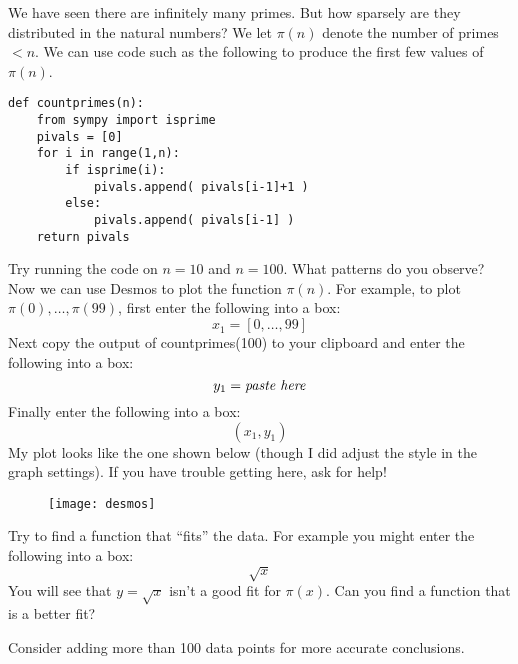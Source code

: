 \documentclass[12pt]{exam}
\begin{document}
\begin{questions}
  \question We have seen there are infinitely many primes. But how sparsely are they distributed in the natural numbers? We let $\pi(n)$ denote the number of primes $<n$. We can use code such as the following to produce the first few values of $\pi(n)$.
  
  \begin{lstlisting}
def countprimes(n):
    from sympy import isprime
    pivals = [0]
    for i in range(1,n):
        if isprime(i):
            pivals.append( pivals[i-1]+1 )
        else:
            pivals.append( pivals[i-1] )
    return pivals
  \end{lstlisting}
  
  Try running the code on $n=10$ and $n=100$. What patterns do you observe?
  \newpage
  \question Now we can use Desmos to plot the function $\pi(n)$. For example, to plot $\pi(0),\ldots,\pi(99)$, first enter the following into a box:
  \[x_1=[0,\ldots,99]
  \]
  Next copy the output of countprimes(100) to your clipboard and enter the following into a box:
  \[y_1=\emph{paste here}
  \]
  Finally enter the following into a box:
  \[(x_1,y_1)
  \]
  My plot looks like the one shown below (though I did adjust the style in the graph settings). If you have trouble getting here, ask for help!
  \begin{figure}[h]
    \centering
    \texttt{[image: desmos]}
  \end{figure}
  Try to find a function that ``fits'' the data. For example you might enter the following into a box:
  \[\sqrt{x}
  \]
  You will see that $y=\sqrt{x}$ isn't a good fit for $\pi(x)$. Can you find a function that is a better fit?
 
  Consider adding more than 100 data points for more accurate conclusions.
\end{questions}
\end{document}
